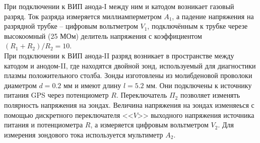 \documentclass[a4paper,12pt]{article}
\begin{document}
При подключении к ВИП анода-I между ним и катодом возникает газовый разряд. Ток разряда измеряется миллиамперметром $A_1$, а падение напряжения на разрядной трубке -- цифровым вольтметром $V_1$, подключённым к трубке черезе высокоомный (25 МОм) делитель напряжения с коэффициентом $(R_1+R_2)/R_2 = 10$.\\
При подключении к ВИП анода-II разряд возникает в пространстве между катодом и анодом-II, где находятся двойной зонд, используемый для диагностики плазмы положительного столба. Зонды изготовлены из молибденовой проволоки диаметром $d = 0.2$ мм и имеют длину $l = 5.2$ мм. Они подключены к источнику питания GPS через потенциометр $R$. Переключатель $\Pi_2$ позволяет изменять полярность напряжения на зондах. Величина напряжения на зондах изменяеься с помощью дискретного переключателя <<$V$>> выходного напряжения источника питания и потенциометра $R$, а измеряется цифровым вольтметром $V_2$. Для измерения зондового тока используется мультиметр $A_2$.
\end{document}

